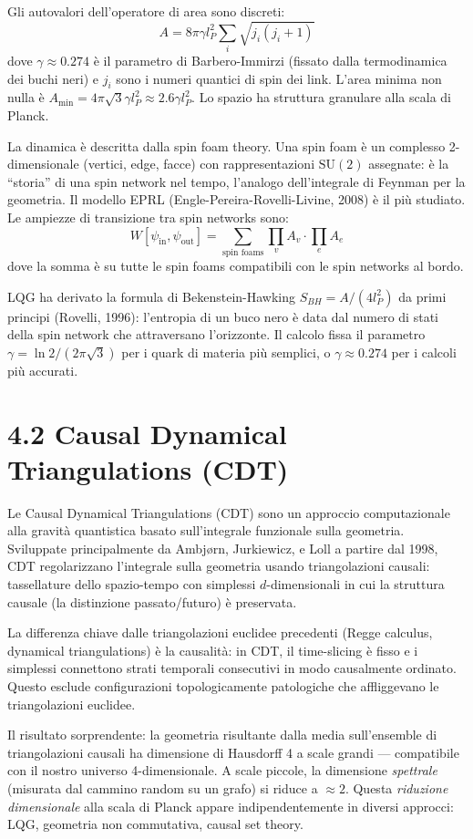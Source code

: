 \documentclass[11.5pt,a4paper,openany]{book}
\theoremstyle{remark}
\begin{document}
Gli autovalori dell'operatore di area sono discreti:
\[
A = 8\pi\gamma l_P^2 \sum_i \sqrt{j_i(j_i+1)}
\]
dove $\gamma \approx 0.274$ è il parametro di Barbero-Immirzi (fissato dalla termodinamica dei buchi neri) e $j_i$ sono i numeri quantici di spin dei link. L'area minima non nulla è $A_{\min} = 4\pi\sqrt{3}\gamma l_P^2 \approx 2.6\gamma l_P^2$. Lo spazio ha struttura granulare alla scala di Planck.

La dinamica è descritta dalla spin foam theory. Una spin foam è un complesso 2-dimensionale (vertici, edge, facce) con rappresentazioni $\mathrm{SU}(2)$ assegnate: è la ``storia'' di una spin network nel tempo, l'analogo dell'integrale di Feynman per la geometria. Il modello EPRL (Engle-Pereira-Rovelli-Livine, 2008) è il più studiato. Le ampiezze di transizione tra spin networks sono:
\[
W[\psi_{\text{in}}, \psi_{\text{out}}] = \sum_{\text{spin foams}} \prod_v A_v \cdot \prod_e A_e
\]
dove la somma è su tutte le spin foams compatibili con le spin networks al bordo.

LQG ha derivato la formula di Bekenstein-Hawking $S_{BH} = A/(4l_P^2)$ da primi principi (Rovelli, 1996): l'entropia di un buco nero è data dal numero di stati della spin network che attraversano l'orizzonte. Il calcolo fissa il parametro $\gamma = \ln 2/(2\pi\sqrt{3})$ per i quark di materia più semplici, o $\gamma \approx 0.274$ per i calcoli più accurati.

\section{4.2 Causal Dynamical Triangulations (CDT)}

Le Causal Dynamical Triangulations (CDT) sono un approccio computazionale alla gravità quantistica basato sull'integrale funzionale sulla geometria. Sviluppate principalmente da Ambjørn, Jurkiewicz, e Loll a partire dal 1998, CDT regolarizzano l'integrale sulla geometria usando triangolazioni causali: tassellature dello spazio-tempo con simplessi $d$-dimensionali in cui la struttura causale (la distinzione passato/futuro) è preservata.

La differenza chiave dalle triangolazioni euclidee precedenti (Regge calculus, dynamical triangulations) è la causalità: in CDT, il time-slicing è fisso e i simplessi connettono strati temporali consecutivi in modo causalmente ordinato. Questo esclude configurazioni topologicamente patologiche che affliggevano le triangolazioni euclidee.

Il risultato sorprendente: la geometria risultante dalla media sull'ensemble di triangolazioni causali ha dimensione di Hausdorff 4 a scale grandi --- compatibile con il nostro universo 4-dimensionale. A scale piccole, la dimensione \textit{spettrale} (misurata dal cammino random su un grafo) si riduce a $\approx 2$. Questa \textit{riduzione dimensionale} alla scala di Planck appare indipendentemente in diversi approcci: LQG, geometria non commutativa, causal set theory.
\end{document}
